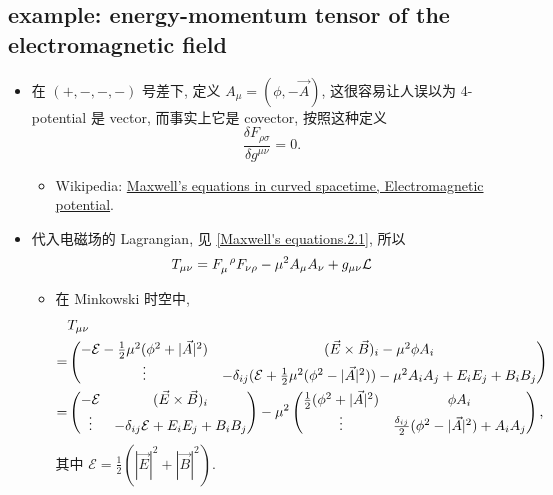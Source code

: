 \subsection{example: energy-momentum tensor of the electromagnetic field} \label{subsection classical field theory and Noether's theorem.4.1}
\begin{itemize}
	\item 在 $(+, -, -, -)$ 号差下, 定义 $A_\mu = (\phi, - \vec{A})$, 这很容易让人误以为 4-potential 是 vector, 而事实上它是 covector, 按照这种定义
	\begin{equation}
		\frac{\delta F_{\rho \sigma}}{\delta g^{\mu \nu}} = 0.
	\end{equation}
	\begin{itemize}
		\item Wikipedia: \href{https://en.wikipedia.org/wiki/Maxwell%27s_equations_in_curved_spacetime#Electromagnetic_potential}{Maxwell's equations in curved spacetime, Electromagnetic potential}.
	\end{itemize}
	
	\item 代入电磁场的 Lagrangian, 见 \eqref{Maxwell's equations.2.1}, 所以
	\begin{equation}
		T_{\mu \nu} = \tensor{F}{_\mu^\rho} F_{\nu \rho} - \mu^2 A_\mu A_\nu + g_{\mu \nu} \mathcal{L}
	\end{equation}
	
	\begin{itemize}
		\item 在 Minkowski 时空中,
		\begin{align}
			& T_{\mu \nu} \notag \\
			=& \begin{pmatrix}
				- \mathcal{E} - \frac{1}{2} \mu^2 (\phi^2 + |\vec{A}|^2) & (\vec{E} \times \vec{B})_i - \mu^2 \phi A_i \\
				\vdots & - \delta_{i j} (\mathcal{E} + \frac{1}{2} \mu^2 (\phi^2 - |\vec{A}|^2)) - \mu^2 A_i A_j + E_i E_j + B_i B_j
			\end{pmatrix} \notag \\
			=& \begin{pmatrix}
				- \mathcal{E} & (\vec{E} \times \vec{B})_i \\
				\vdots & - \delta_{i j} \mathcal{E} + E_i E_j + B_i B_j
			\end{pmatrix} - \mu^2 \begin{pmatrix}
				\frac{1}{2} (\phi^2 + |\vec{A}|^2) & \phi A_i \\
				\vdots & \frac{\delta_{i j}}{2} (\phi^2 - |\vec{A}|^2) + A_i A_j
			\end{pmatrix},
		\end{align}
		其中 $\mathcal{E} = \frac{1}{2} (|\vec{E}|^2 + |\vec{B}|^2)$.
		

\end{itemize}
\end{itemize}
